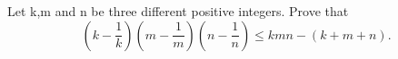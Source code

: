 Let k,m and n be three different positive integers. Prove that \[ 
	\left( k-\frac{1}{k} \right)\left( m-\frac{1}{m} \right)\left( n-\frac{1}{n} \right) \le kmn-(k+m+n). \]